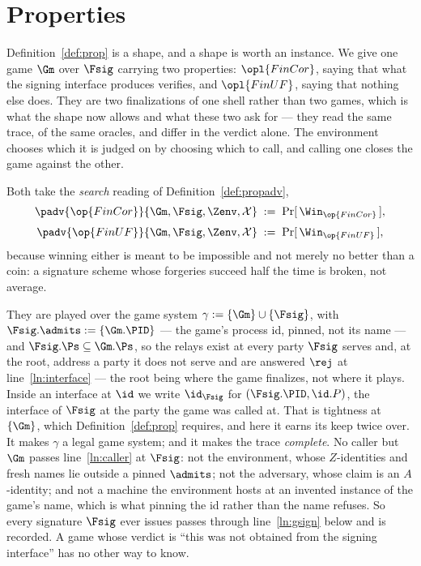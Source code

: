 \documentclass[10pt,oneside,openany]{book}
\theoremstyle{accentdef}
\theoremstyle{accentplain}
\begin{document}


\section{Properties}\label{sec:sigprops}

Definition~\ref{def:prop} is a shape, and a shape is worth an instance. We give one game $\Gm$ over
$\Fsig$ carrying two properties: $\opl{FinCor}$, saying that what the signing interface produces
verifies, and $\opl{FinUF}$, saying that nothing else does. They are two finalizations of one shell
rather than two games, which is what the shape now allows and what these two ask for --- they read
the same trace, of the same oracles, and differ in the verdict alone. The environment chooses which
it is judged on by choosing which to call, and calling one closes the game against the other.

Both take the \emph{search} reading of Definition~\ref{def:propadv},
\[
  \begin{gathered}
  \padv{\op{FinCor}}{\Gm,\Fsig,\Zenv,\mathcal{X}} \;:=\; \Pr[\,\Win_{\op{FinCor}}\,] , \\[3pt]
  \padv{\op{FinUF}}{\Gm,\Fsig,\Zenv,\mathcal{X}} \;:=\; \Pr[\,\Win_{\op{FinUF}}\,] ,
  \end{gathered}
\]
because winning either is meant to be impossible and not merely no better than a coin: a signature
scheme whose forgeries succeed half the time is broken, not average.

They are played over the game system $\gamma := \{\Gm\} \cup \{\Fsig\}$, with
$\Fsig.\admits := \{\Gm.\PID\}$ --- the game's process id, pinned, not its name --- and
$\Fsig.\Ps \subseteq \Gm.\Ps$, so the relays exist at every party $\Fsig$ serves and, at the
root, address a party it does not serve and are answered $\rej$ at line~\ref{ln:interface} --- the
root being where the game finalizes, not where it plays. Inside an interface at $\id$ we write
$\id_{\Fsig}$ for $(\Fsig.\PID,\id.P)$, the interface of $\Fsig$ at the party the game was called at.
That is tightness at $\{\Gm\}$, which Definition~\ref{def:prop}
requires, and here it earns its keep twice over. It makes $\gamma$ a legal game system; and it makes
the trace \emph{complete}. No caller but $\Gm$ passes line~\ref{ln:caller} at $\Fsig$: not the
environment, whose $Z$-identities and fresh names lie outside a pinned $\admits$; not the adversary,
whose claim is an $A$-identity; and not a machine the environment hosts at an invented instance of the
game's name, which is what pinning the id rather than the name refuses. So every signature $\Fsig$
ever issues passes through line~\ref{ln:gsign} below and is recorded. A game whose verdict is
``this was not obtained from the signing interface'' has no other way to know.
\end{document}
